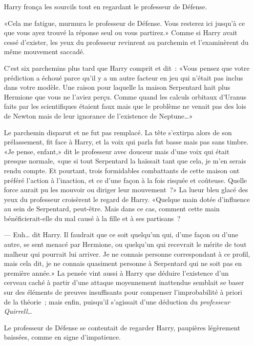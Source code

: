 Harry fronça les sourcils tout en regardant le professeur de Défense.

«Cela me fatigue, murmura le professeur de Défense. Vous resterez ici jusqu'à ce que vous ayez trouvé la réponse seul ou vous partirez.» Comme si Harry avait cessé d'exister, les yeux du professeur revinrent au parchemin et l'examinèrent du même mouvement saccadé.

C'est six parchemins plus tard que Harry comprit et dit~: «Vous pensez que votre prédiction a échoué parce qu'il y a un autre facteur en jeu qui n'était pas inclus dans votre modèle. Une raison pour laquelle la maison Serpentard hait plus Hermione que vous ne l'aviez perçu. Comme quand les calculs orbitaux d'Uranus faits par les scientifiques étaient faux mais que le problème ne venait pas des lois de Newton mais de leur ignorance de l'existence de Neptune…»

Le parchemin disparut et ne fut pas remplacé. La tête s'extirpa alors de son prélassement, fit face à Harry, et la voix qui parla fut basse mais pas sans timbre. «Je pense, enfant,» dit le professeur avec douceur mais d'une voix qui était presque normale, «que si tout Serpentard la haïssait tant que cela, je m'en serais rendu compte. Et pourtant, trois formidables combattants de cette maison ont préféré l'action à l'inaction, et ce d'une façon à la fois risquée et coûteuse. Quelle force aurait pu les mouvoir ou diriger leur mouvement~?» La lueur bleu glacé des yeux du professeur croisèrent le regard de Harry. «Quelque main dotée d'influence au sein de Serpentard, peut-être. Mais dans ce cas, comment cette main bénéficierait-elle du mal causé à la fille et à ses partisans~?

--- Euh… dit Harry. Il faudrait que ce soit quelqu'un qui, d'une façon ou d'une autre, se sent menacé par Hermione, ou quelqu'un qui recevrait le mérite de tout malheur qui pourrait lui arriver. Je ne connais personne correspondant à ce profil, mais cela dit, je ne connais quasiment personne à Serpentard qui ne soit pas en première année.» La pensée vint aussi à Harry que déduire l'existence d'un cerveau caché à partir d'une attaque moyennement inattendue semblait se baser sur des éléments de preuves insuffisants pour compenser l'improbabilité à priori de la théorie~; mais enfin, puisqu'il s'agissait d'une déduction du \emph{professeur Quirrell}…

Le professeur de Défense se contentait de regarder Harry, paupières légèrement baissées, comme en signe d'impatience.

